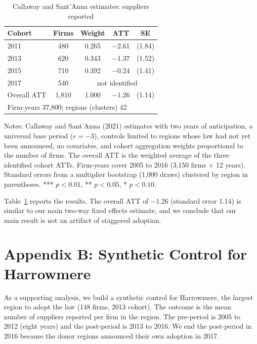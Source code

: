 \documentclass[11pt]{article}
\begin{document}
\begin{table}[ht]
\centering
\begin{threeparttable}
\caption{Callaway and Sant'Anna estimates: suppliers reported}
\label{tab:cs}
\small
\begin{tabular}{lcccc}
\toprule
Cohort & Firms & Weight & ATT & SE \\
\midrule
2011 & 480 & 0.265 & $-$2.61 & (1.84) \\
2013 & 620 & 0.343 & $-$1.37 & (1.52) \\
2015 & 710 & 0.392 & $-$0.24 & (1.41) \\
2017 & 540 & \multicolumn{3}{c}{not identified} \\
\midrule
Overall ATT & 1,810 & 1.000 & $-$1.26 & (1.14) \\
\midrule
\multicolumn{5}{l}{Firm-years 37,800; regions (clusters) 42} \\
\bottomrule
\end{tabular}
\begin{tablenotes}\footnotesize
\item Notes: Callaway and Sant'Anna (2021) estimates with two years of anticipation, a universal base period ($e = -3$), controls limited to regions whose law had not yet been announced, no covariates, and cohort aggregation weights proportional to the number of firms. The overall ATT is the weighted average of the three identified cohort ATTs. Firm-years cover 2005 to 2016 (3,150 firms $\times$ 12 years). Standard errors from a multiplier bootstrap (1,000 draws) clustered by region in parentheses. *** $p<0.01$, ** $p<0.05$, * $p<0.10$.
\end{tablenotes}
\end{threeparttable}
\end{table}

Table~\ref{tab:cs} reports the results. The overall ATT of $-1.26$ (standard error 1.14) is similar to our main two-way fixed effects estimate, and we conclude that our main result is not an artifact of staggered adoption.

\clearpage
\section*{Appendix B: Synthetic Control for Harrowmere}

As a supporting analysis, we build a synthetic control \citep{adh2010} for Harrowmere, the largest region to adopt the law (148 firms, 2013 cohort). The outcome is the mean number of suppliers reported per firm in the region. The pre-period is 2005 to 2012 (eight years) and the post-period is 2013 to 2016. We end the post-period in 2016 because the donor regions announced their own adoption in 2017.
\end{document}
